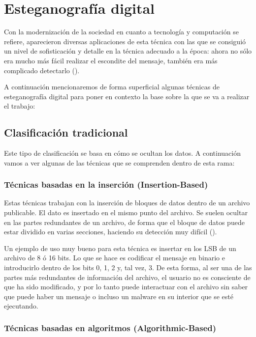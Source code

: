 \section{Esteganografía digital}

Con la modernización de la sociedad en cuanto a tecnología y computación se refiere, aparecieron diversas aplicaciones de esta técnica con las que se consiguió un nivel de sofisticación y detalle en la técnica adecuado a la época: ahora no sólo era mucho más fácil realizar el escondite del mensaje, también era más complicado detectarlo (\cite{esteganografia-digital}). %

A continuación mencionaremos de forma superficial algunas técnicas  de esteganografía digital para poner en contexto la base sobre la que se va a realizar el trabajo:

\subsection{Clasificación tradicional}
\label{sec:trad}

Este tipo de clasificación se basa en cómo se ocultan los datos. A continuación vamos a ver algunas de las técnicas que se comprenden dentro de esta rama:

\subsubsection{Técnicas basadas en la inserción (Insertion-Based)}

Estas técnicas trabajan con la inserción de bloques de datos dentro de un archivo publicable. El dato es insertado en el mismo punto del archivo. Se suelen ocultar en las partes redundantes de un archivo, de forma que el bloque de datos puede estar dividido en varias secciones, haciendo su detección muy difícil (\cite{esteganografia-digital}).%

Un ejemplo de uso muy bueno para esta técnica es insertar en los \ac{LSB} de un archivo de 8 ó 16 bits. Lo que se hace es codificar el mensaje en binario e introducirlo dentro de los bits 0, 1, 2 y, tal vez, 3. De esta forma, al ser una de las partes más redundantes de información del archivo, el usuario no es consciente de que ha sido modificado, y por lo tanto puede interactuar con el archivo sin saber que puede haber un mensaje o incluso un malware en su interior que se esté ejecutando.

\subsubsection{Técnicas basadas en algoritmos (Algorithmic-Based)} 

